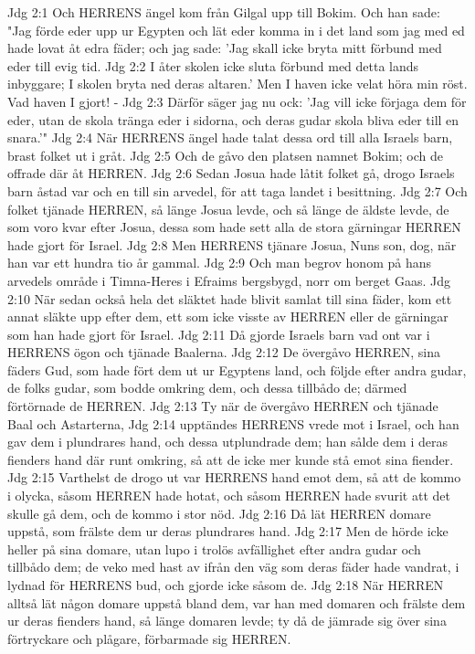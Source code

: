 Jdg 2:1  Och HERRENS ängel kom från Gilgal upp till Bokim. Och han sade: "Jag förde eder upp ur Egypten och lät eder komma in i det land som jag med ed hade lovat åt edra fäder; och jag sade: 'Jag skall icke bryta mitt förbund med eder till evig tid.
Jdg 2:2  I åter skolen icke sluta förbund med detta lands inbyggare; I skolen bryta ned deras altaren.' Men I haven icke velat höra min röst. Vad haven I gjort! -
Jdg 2:3  Därför säger jag nu ock: 'Jag vill icke förjaga dem för eder, utan de skola tränga eder i sidorna, och deras gudar skola bliva eder till en snara.'"
Jdg 2:4  När HERRENS ängel hade talat dessa ord till alla Israels barn, brast folket ut i gråt.
Jdg 2:5  Och de gåvo den platsen namnet Bokim; och de offrade där åt HERREN.
Jdg 2:6  Sedan Josua hade låtit folket gå, drogo Israels barn åstad var och en till sin arvedel, för att taga landet i besittning.
Jdg 2:7  Och folket tjänade HERREN, så länge Josua levde, och så länge de äldste levde, de som voro kvar efter Josua, dessa som hade sett alla de stora gärningar HERREN hade gjort för Israel.
Jdg 2:8  Men HERRENS tjänare Josua, Nuns son, dog, när han var ett hundra tio år gammal.
Jdg 2:9  Och man begrov honom på hans arvedels område i Timna-Heres i Efraims bergsbygd, norr om berget Gaas.
Jdg 2:10  När sedan också hela det släktet hade blivit samlat till sina fäder, kom ett annat släkte upp efter dem, ett som icke visste av HERREN eller de gärningar som han hade gjort för Israel.
Jdg 2:11  Då gjorde Israels barn vad ont var i HERRENS ögon och tjänade Baalerna.
Jdg 2:12  De övergåvo HERREN, sina fäders Gud, som hade fört dem ut ur Egyptens land, och följde efter andra gudar, de folks gudar, som bodde omkring dem, och dessa tillbådo de; därmed förtörnade de HERREN.
Jdg 2:13  Ty när de övergåvo HERREN och tjänade Baal och Astarterna,
Jdg 2:14  upptändes HERRENS vrede mot i Israel, och han gav dem i plundrares hand, och dessa utplundrade dem; han sålde dem i deras fienders hand där runt omkring, så att de icke mer kunde stå emot sina fiender.
Jdg 2:15  Varthelst de drogo ut var HERRENS hand emot dem, så att de kommo i olycka, såsom HERREN hade hotat, och såsom HERREN hade svurit att det skulle gå dem, och de kommo i stor nöd.
Jdg 2:16  Då lät HERREN domare uppstå, som frälste dem ur deras plundrares hand.
Jdg 2:17  Men de hörde icke heller på sina domare, utan lupo i trolös avfällighet efter andra gudar och tillbådo dem; de veko med hast av ifrån den väg som deras fäder hade vandrat, i lydnad för HERRENS bud, och gjorde icke såsom de.
Jdg 2:18  När HERREN alltså lät någon domare uppstå bland dem, var han med domaren och frälste dem ur deras fienders hand, så länge domaren levde; ty då de jämrade sig över sina förtryckare och plågare, förbarmade sig HERREN.
